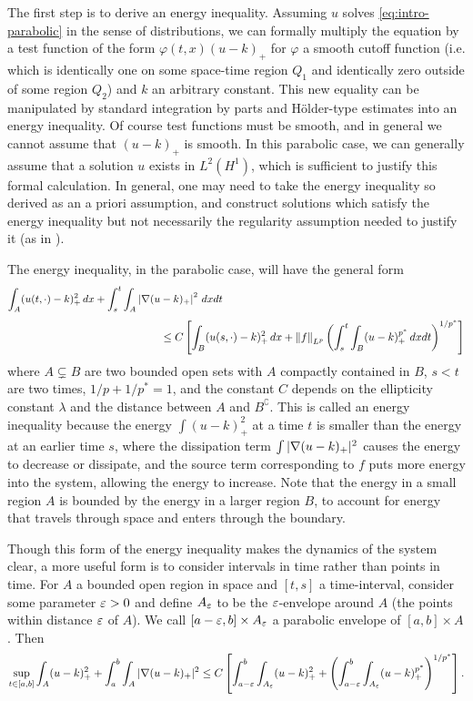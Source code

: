 The first step is to derive an energy inequality.  Assuming $u$ solves \eqref{eq:intro-parabolic} in the sense of distributions, we can formally multiply the equation by a test function of the form $\varphi(t,x) (u-k)_+$ for $\varphi$ a smooth cutoff function (i.e. which is identically one on some space-time region $Q_1$ and identically zero outside of some region $Q_2$) and $k$ an arbitrary constant.  This new equality can be manipulated by standard integration by parts and H\"{o}lder-type estimates into an energy inequality.  Of course test functions must be smooth, and in general we cannot assume that $(u-k)_+$ is smooth.  In this parabolic case, we can generally assume that a solution $u$ exists in $L^2(H^1)$, which is sufficient to justify this formal calculation.  In general, one may need to take the energy inequality so derived as an a priori assumption, and construct solutions which satisfy the energy inequality but not necessarily the regularity assumption needed to justify it (as in \cite{StVa.sqg}).  

The energy inequality, in the parabolic case, will have the general form
\[ \int_{A} (u(t,\cdot)-k)_+^2 \,dx + \int_s^t \int_A \abs{\grad (u-k)_+}^2 \,dxdt \hskip8cm\]
\[ \hskip5cm \leq C \bracket{\int_B (u(s,\cdot)-k)_+^2 \,dx + \norm{f}_{L^p} \paren{\int_s^t \int_B (u-k)_+^{p^*} \,dxdt}^{1/p^*}} \]
where $A \subsetneq B$ are two bounded open sets with $A$ compactly contained in $B$, $s < t$ are two times, $1/p + 1/p^* = 1$, and the constant $C$ depends on the ellipticity constant $\lambda$ and the distance between $A$ and $B^\complement$.  This is called an energy inequality because the energy $\int(u-k)_+^2$ at a time $t$ is smaller than the energy at an earlier time $s$, where the dissipation term $\int |\nabla (u-k)_+|^2$ causes the energy to decrease or dissipate, and the source term corresponding to $f$ puts more energy into the system, allowing the energy to increase.  Note that the energy in a small region $A$ is bounded by the energy in a larger region $B$, to account for energy that travels through space and enters through the boundary.  

Though this form of the energy inequality makes the dynamics of the system clear, a more useful form is to consider intervals in time rather than points in time.  For $A$ a bounded open region in space and $[t,s]$ a time-interval, consider some parameter $\varepsilon > 0$ and define $A_\varepsilon$ to be the $\varepsilon$-envelope around $A$ (the points within distance $\varepsilon$ of $A$).  We call $[a-\varepsilon,b] \times A_\varepsilon$ a parabolic envelope of $[a,b] \times A$.  Then
\begin{equation} \label{intro-energy inequality}
\sup_{t \in [a,b]} \int_A (u-k)_+^2 + \int_a^b \int_A |\nabla (u-k)_+|^2 \leq C \left[  \int_{a-\varepsilon}^b \int_{A_\varepsilon} (u-k)_+^2 + \left( \int_{a-\varepsilon}^b \int_{A_\varepsilon} (u-k)_+^{p^*}  \right)^{1/p^*}  \right]. 
\end{equation}

